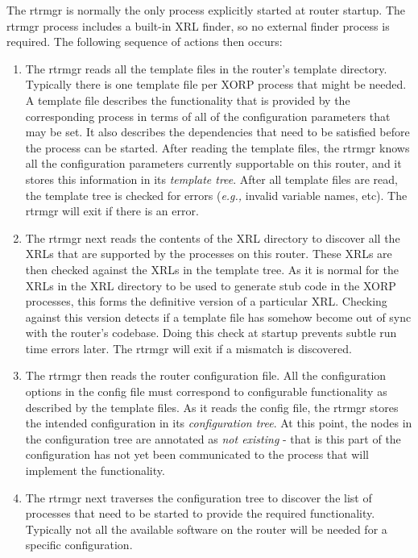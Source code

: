 \documentclass[11pt]{article}
\newcommand{\eg}{\emph{e.g.,}\xspace}
\begin{document}
The rtrmgr is normally the only process explicitly started at router
startup.  The rtrmgr process includes a built-in XRL finder, so no
external finder process is required.  The following sequence of
actions then occurs:

\begin{enumerate}

  \item The rtrmgr reads all the template files in the router's template
directory.  Typically there is one template file per XORP process that
might be needed.  A template file describes the functionality that is
provided by the corresponding process in terms of all of the
configuration parameters that may be set.  It also describes the
dependencies that need to be satisfied before the process can be
started.  After reading the template files, the rtrmgr knows all the
configuration parameters currently supportable on this router, and it
stores this information in its \textit{template tree}.
After all template files are read, the template tree is checked for
errors (\eg invalid variable names, etc). The rtrmgr will exit
if there is an error.

  \item The rtrmgr next reads the contents of the XRL directory to discover
all the XRLs that are supported by the processes on this router.
These XRLs are then checked against the XRLs in the template tree.  As
it is normal for the XRLs in the XRL directory to be used to generate
stub code in the XORP processes, this forms the definitive version of
a particular XRL.  Checking against this version detects if a template
file has somehow become out of sync with the router's codebase.  Doing
this check at startup prevents subtle run time errors later.  The
rtrmgr will exit if a mismatch is discovered.

  \item The rtrmgr then reads the router configuration file.  All the
configuration options in the config file must correspond to
configurable functionality as described by the template files.  As it
reads the config file, the rtrmgr stores the intended configuration in
its \textit{configuration tree}.  At this point, the nodes in the
configuration tree are annotated as \textit{not existing} - that is
this part of the configuration has not yet been communicated to the
process that will implement the functionality.

  \item The rtrmgr next traverses the configuration tree to discover the list
of processes that need to be started to provide the required
functionality.  Typically not all the available software on the router
will be needed for a specific configuration.


\end{enumerate}
\end{document}
